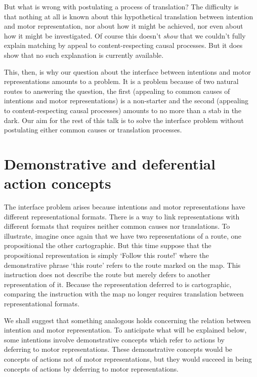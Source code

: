 \documentclass[12pt,\papersize]{extarticle}
\begin{document}
But what is wrong with postulating a process of translation? The difficulty is that nothing at all is known about this hypothetical translation between intention and motor representation, nor about how it might be achieved, nor even about how it might be investigated. Of course this doesn't \emph{show} that we couldn't fully explain matching by appeal to content-respecting causal processes. But it does show that no such explanation is currently available.  

This, then, is why our question about the interface between intentions and motor representations amounts to a problem. It is a problem because of two natural routes to answering the question, the first (appealing to common causes of intentions and motor representations) is a non-starter and the second (appealing to content-respecting causal processes) amounts to no more than a stab in the dark.  Our aim for the rest of this talk is to solve the interface problem without postulating either common causes or translation processes.

\section{Demonstrative and deferential action concepts}

The interface problem  arises because intentions and motor representations have different representational formats.
There is a way to link representations with different formats that requires neither common causes nor translations. To illustrate, imagine once again that we have two representations of a route, one propositional the other cartographic. But this time suppose that the propositional representation is simply `Follow this route!' where the demonstrative phrase `this route' refers to the route marked on the map. This instruction does not describe the route but merely defers to another representation of it. Because the representation deferred to is cartographic, comparing the instruction with the map no longer requires translation between representational formats. 

We shall suggest that something analogous holds concerning the relation between intention and motor representation. To anticipate what will be explained below, some intentions involve demonstrative concepts which refer to actions by deferring to motor representations.
These demonstrative concepts would be concepts of actions not of motor representations, but they would succeed in being concepts of actions by deferring to motor representations. 
\end{document}
